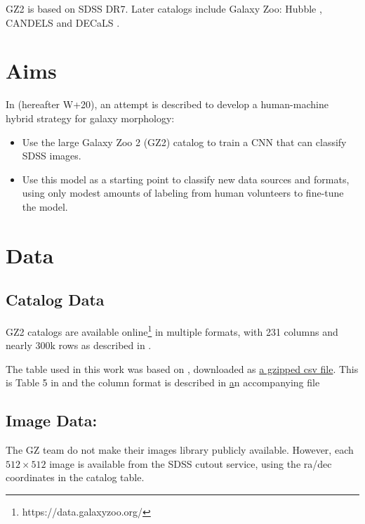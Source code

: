 \documentclass[twocolumn, twocolappendix, tighten]{aastex631}
\begin{document}
GZ2 \citep{willett_galaxy_2013, 2016MNRAS.461.3663H} is based on SDSS DR7. Later catalogs include Galaxy Zoo: Hubble \citep{2017MNRAS.464.4176W}, CANDELS \citep{2017MNRAS.464.4420S} and DECaLS \citep{walmsley_galaxy_2022}.

\section{Aims}

In \citet{walmsley_galaxy_2020} (hereafter W+20), an attempt is described to develop a human-machine hybrid strategy for galaxy morphology:
\begin{itemize}
	\item Use the large Galaxy Zoo 2 (GZ2) catalog to train a CNN that can classify SDSS images.
	\item Use this model as a starting point to classify new data sources and formats, using only modest amounts of labeling from human volunteers to fine-tune the model.
\end{itemize}


\section{Data} \label{sec:data}

\subsection{Catalog Data} 

GZ2 catalogs are available online\footnote{https://data.galaxyzoo.org/} in multiple formats, with 231 columns and nearly 300k rows as described in \citet{willett_galaxy_2013}.

The table used in this work was based on \citet{2016MNRAS.461.3663H}, downloaded as \href{https://zooniverse-data.s3.amazonaws.com/galaxy-zoo-2/zoo2MainSpecz.csv.gz}{a gzipped csv file}.  This is Table 5 in \citet{willett_galaxy_2013} and the column format is described in \href{https://data.galaxyzoo.org/data/gz2/zoo2MainSpecz.txt} an accompanying file

\subsection{Image Data:} 
The GZ team do not make their images library publicly available. However, each $512 \times 512$ image is available from the SDSS cutout service, using the ra/dec coordinates in the catalog table.
\end{document}
